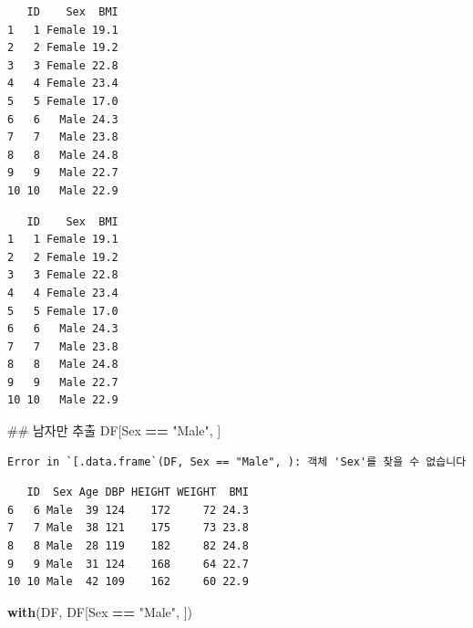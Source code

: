 \documentclass[11pt,a4paper]{book}
\newenvironment{Shaded}{\begin{snugshade}}{\end{snugshade}}
\newcommand{\KeywordTok}[1]{\textcolor[rgb]{0.13,0.29,0.53}{\textbf{#1}}}
\newcommand{\StringTok}[1]{\textcolor[rgb]{0.31,0.60,0.02}{#1}}
\newcommand{\OperatorTok}[1]{\textcolor[rgb]{0.81,0.36,0.00}{\textbf{#1}}}
\newcommand{\NormalTok}[1]{#1}
\theoremstyle{definition}
\theoremstyle{definition}
\theoremstyle{definition}
\theoremstyle{remark}
\begin{document}
\begin{verbatim}
   ID    Sex  BMI
1   1 Female 19.1
2   2 Female 19.2
3   3 Female 22.8
4   4 Female 23.4
5   5 Female 17.0
6   6   Male 24.3
7   7   Male 23.8
8   8   Male 24.8
9   9   Male 22.7
10 10   Male 22.9
\end{verbatim}

\begin{Shaded}
\end{Shaded}

\begin{verbatim}
   ID    Sex  BMI
1   1 Female 19.1
2   2 Female 19.2
3   3 Female 22.8
4   4 Female 23.4
5   5 Female 17.0
6   6   Male 24.3
7   7   Male 23.8
8   8   Male 24.8
9   9   Male 22.7
10 10   Male 22.9
\end{verbatim}

\begin{Shaded}
\begin{Highlighting}[]
\NormalTok{## 남자만 추출}
\NormalTok{DF[Sex }\OperatorTok{==}\StringTok{ "Male"}\NormalTok{, ]}
\end{Highlighting}
\end{Shaded}

\begin{verbatim}
Error in `[.data.frame`(DF, Sex == "Male", ): 객체 'Sex'를 찾을 수 없습니다
\end{verbatim}

\begin{Shaded}
\end{Shaded}

\begin{verbatim}
   ID  Sex Age DBP HEIGHT WEIGHT  BMI
6   6 Male  39 124    172     72 24.3
7   7 Male  38 121    175     73 23.8
8   8 Male  28 119    182     82 24.8
9   9 Male  31 124    168     64 22.7
10 10 Male  42 109    162     60 22.9
\end{verbatim}

\begin{Shaded}
\begin{Highlighting}[]
\KeywordTok{with}\NormalTok{(DF, DF[Sex }\OperatorTok{==}\StringTok{ "Male"}\NormalTok{, ])}
\end{Highlighting}
\end{Shaded}
\end{document}
